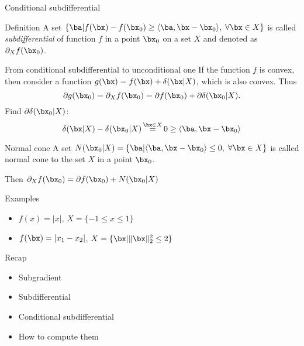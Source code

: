 \documentclass[12pt]{beamer}
\begin{document}
\begin{frame}{Conditional subdifferential}
\footnotesize
\begin{block}{Definition}
\footnotesize
A set 
$
\{ \ba |  f(\bx) - f(\bx_0) \geq \langle \ba, \bx - \bx_0 \rangle, \; \forall \bx \in X \}
$ 
is called \emph{subdifferential} of function $f$ in a point $\bx_0$ on a set $X$ and denoted as $\partial_X f(\bx_0)$.
\end{block}
\begin{block}{From conditional subdifferential to unconditional one}
\footnotesize
If the function $f$ is convex, then consider a function $g(\bx) = f(\bx) + \delta(\bx | X)$, which is also convex.
Thus
\vspace{-2mm} 
\[
\partial g (\bx_0) = \partial_X f(\bx_0) = \partial f(\bx_0) + \partial \delta(\bx_0 | X).
\vspace{-3mm} 
\]
Find $\partial \delta(\bx_0 | X)$:
\vspace{-3mm}
\[
\delta(\bx |X) - \delta(\bx_0 |X) \mathop{=}\limits^{\bx \in X} 0 \geq \langle \ba, \bx - \bx_0 \rangle
\]
\end{block}

\begin{block}{Normal cone}
\footnotesize
A set $N(\bx_0 | X) = \{ \ba | \langle \ba, \bx - \bx_0 \rangle \leq 0, \; \forall \bx \in X \}$ is called normal cone to the set $X$ in a point $\bx_0$.
\end{block}
Then $\partial_X f(\bx_0) = \partial f(\bx_0) + N(\bx_0 | X)$  
\end{frame}

\begin{frame}{Examples}
\begin{itemize}
\item $f(x) = |x|$, $X = \{-1 \leq x \leq 1 \}$
\item $f(\bx) = |x_1 - x_2|$, $X = \{ \bx | \| \bx \|^2_2 \leq 2 \}$
\end{itemize}
\end{frame}

\begin{frame}{Recap}
\begin{itemize}
\item Subgradient
\item Subdifferential
\item Conditional subdifferential
\item How to compute them
\end{itemize}
\end{frame}
\end{document}
